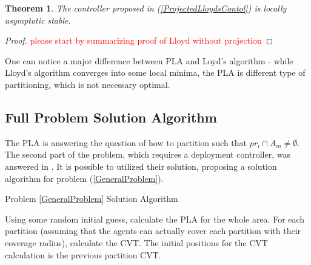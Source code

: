 \documentclass{iacas}
\newtheorem{theorem}{Theorem}
\begin{document}
\begin{theorem}
The controller proposed in (\ref{ProjectedLloydsContol}) is locally asymptotic stable.
\end{theorem}

\begin{proof}
\textcolor{red}{please start by summarizing proof of Lloyd without projection}
\end{proof}

One can notice a major difference between PLA and Loyd's algorithm - while Lloyd's algorithm converges into some local minima, the PLA is different type of partitioning, which is not necessary optimal.


\subsection{Full Problem Solution Algorithm}
The PLA is answering the question of how to partition such that $pr_i \cap A_m \neq \emptyset$. The second part of the problem, which requires a deployment controller, was answered in \cite{Cortes2004}. It is possible to utilized their solution, proposing a solution algorithm for problem (\ref{GeneralProblem}).

\begin{algorithm}[H]
\caption{Problem \ref{GeneralProblem} Solution Algorithm}\label{GeneralProbSolution}
\begin{algorithmic}[1]
\State Using some random initial guess, calculate the PLA for the whole area.
\State For each partition (assuming that the agents can actually cover each partition with their coverage radius), calculate the CVT. The initial positions for the CVT calculation is the previous partition CVT.
\end{algorithmic}
\label{algo:problem solution algorithm}
\end{algorithm}
\end{document}
